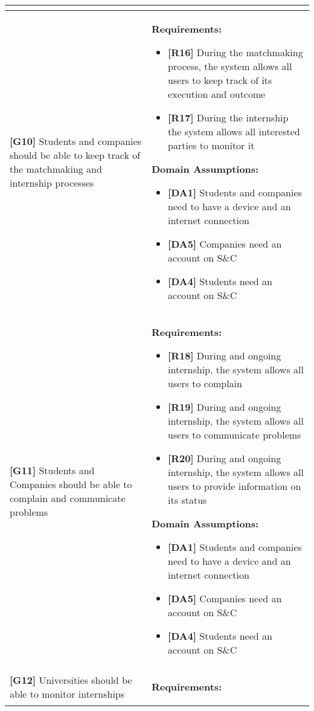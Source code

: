 \begin{longtable}{|p{}|p{}|}
\begin{itemize}
\end{itemize} \\
\hline
\textbf{[G10]} Students and companies should be able to keep track of the matchmaking and internship processes
& 
\textbf{Requirements:}
\begin{itemize}
    \item \textbf{[R16]} During the matchmaking process, the system allows all users to keep track of its execution and outcome
    \item \textbf{[R17]} During the internship the system allows all interested parties to monitor it
\end{itemize}
\textbf{Domain Assumptions:}
\begin{itemize}
    \item \textbf{[DA1]} Students and companies need to have a device and an internet connection
    \item \textbf{[DA5]} Companies need an account on S\&C
    \item \textbf{[DA4]} Students need an account on S\&C
\end{itemize} \\
\hline
\textbf{[G11]} Students and Companies should be able to complain and communicate problems
& 
\textbf{Requirements:}
\begin{itemize}
    \item \textbf{[R18]} During and ongoing internship, the system allows all users to complain
    \item \textbf{[R19]} During and ongoing internship, the system allows all users to communicate problems
    \item \textbf{[R20]} During and ongoing internship, the system allows all users to provide information on its status
\end{itemize}
\textbf{Domain Assumptions:}
\begin{itemize}
    \item \textbf{[DA1]} Students and companies need to have a device and an internet connection
    \item \textbf{[DA5]} Companies need an account on S\&C
    \item \textbf{[DA4]} Students need an account on S\&C
\end{itemize} \\
\hline
\textbf{[G12]} Universities should be able to monitor internships
& 
\textbf{Requirements:}
\begin{itemize}


\end{itemize}
\end{longtable}
